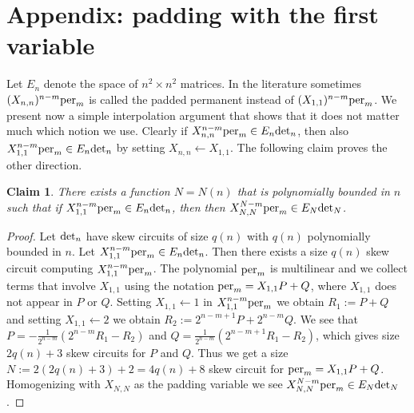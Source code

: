 \documentclass{article}
\numberwithin{equation}{section}
\newtheorem{claim}[equation]{Claim}
\theoremstyle{definition}
\renewcommand{\det}{\textup{det}}
\newcommand{\per}{\textup{per}}
\begin{document}
\section{Appendix: padding with the first variable}\label{subsec:additionalvar}
Let $E_n$ denote the space of $n^2 \times n^2$ matrices.
In the literature sometimes $(X_{n,n})^{n-m}\per_m$ is called the padded permanent instead of $(X_{1,1})^{n-m}\per_m$.
We present now a simple interpolation argument that shows that it does not matter much which notion we use.
Clearly if $X_{n,n}^{n-m}\per_m \in E_n\det_n$, then also $X_{1,1}^{n-m}\per_m \in E_n\det_n$
by setting $X_{n,n} \leftarrow X_{1,1}$.
The following claim proves the other direction.
\begin{claim}
There exists a function $N=N(n)$ that is polynomially bounded in $n$ such that
if $X_{1,1}^{n-m}\per_m \in E_n\det_n$, then
then $X_{N,N}^{N-m}\per_m \in E_{N}\det_{N}$.
\end{claim}
\begin{proof}
Let $\det_n$ have skew circuits of size $q(n)$ with $q(n)$ polynomially bounded in $n$.
Let $X_{1,1}^{n-m}\per_m \in E_n\det_n$.
Then there exists a size $q(n)$ skew circuit computing $X_{1,1}^{n-m}\per_m$.
The polynomial $\per_m$ is multilinear and we collect terms that involve $X_{1,1}$ using the notation
$\per_m = X_{1,1}P + Q$, where $X_{1,1}$ does not appear in $P$ or $Q$.
Setting $X_{1,1} \leftarrow 1$ in $X_{1,1}^{n-m}\per_m$
we obtain $R_1:=P+Q$ and setting $X_{1,1} \leftarrow 2$ we obtain $R_2:=2^{n-m+1}P+2^{n-m}Q$.
We see that $P = -\frac 1 {2^{n-m}}(2^{n-m}R_1-R_2)$ and $Q=\frac 1 {2^{n-m}}(2^{n-m+1}R_1-R_2)$, which gives size $2q(n)+3$ skew circuits for $P$ and $Q$.
Thus we get a size $N := 2(2q(n)+3)+2=4q(n)+8$ skew circuit for $\per_m = X_{1,1}P + Q$.
Homogenizing with $X_{N,N}$ as the padding variable we see $X_{N,N}^{N-m}\per_m \in E_{N}\det_{N}$.
\end{proof}
\end{document}
